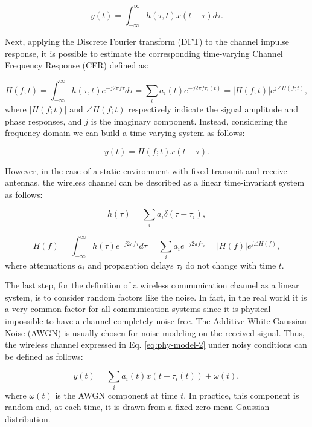 \documentclass[binding=0.6cm,noexaminfo]{sapthesis}
\begin{document}
\begin{equation}
y(t) = \int^{\infty}_{-\infty} h(\tau, t) x(t- \tau) d\tau.
\label{eq:phy-model-3}
\end{equation}

Next, applying the Discrete Fourier transform (DFT) to the channel impulse response, it is possible to estimate the corresponding time-varying Channel Frequency Response (CFR) defined as:

\begin{equation}
H(f;t) = \int^{\infty}_{-\infty} h(\tau, t) e^{-j2\pi f \tau} d\tau = \sum_i a_i(t) e^{-j2\pi f \tau_i(t)} = |H(f;t)| e^{j \angle H(f;t)},
\label{eq:cfr}
\end{equation}
where $|H(f;t)|$ and $\angle H(f;t)$ respectively indicate the signal amplitude and phase responses, and $j$ is the imaginary component. Instead, considering the frequency domain we can build a time-varying system as follows:

\begin{equation}
y(t) = H(f;t) x(t - \tau).
\end{equation}

However, in the case of a static environment with fixed transmit and receive antennas, the wireless channel can be described as a linear time-invariant system as follows:

\begin{equation}
h(\tau) = \sum_i a_i \delta(\tau - \tau_i),
\end{equation}

\begin{equation}
H(f) = \int^{\infty}_{-\infty} h(\tau) e^{-j2\pi f \tau} d\tau = \sum_i a_i e^{-j2\pi f \tau_i} = |H(f)| e^{j \angle H(f)},
\end{equation}
where attenuations $a_i$ and propagation delays $\tau_i$ do not change with time $t$.

The last step, for the definition of a wireless communication channel as a linear system, is to consider random factors like the noise. In fact, in the real world it is a very common factor for all communication systems since it is physical impossible to have a channel completely noise-free. The Additive White Gaussian Noise (AWGN) is usually chosen for noise modeling on the received signal. Thus, the wireless channel expressed in Eq. \ref{eq:phy-model-2} under noisy conditions can be defined as follows:

\begin{equation}
y(t) = \sum_i a_i(t) x(t - \tau_i(t)) + \omega(t),
\end{equation}
where $\omega(t)$ is the AWGN component at time $t$. In practice, this component is random and, at each time, it is drawn from a fixed zero-mean Gaussian distribution.
\end{document}
